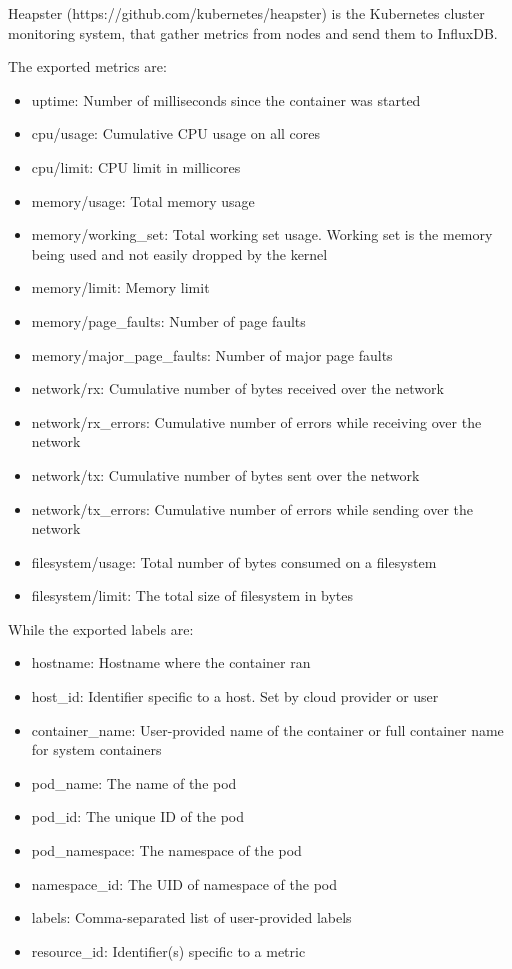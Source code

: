 Heapster (https://github.com/kubernetes/heapster) is the Kubernetes cluster monitoring system, that gather metrics from nodes and send them to InfluxDB.

The exported metrics are:
\begin{itemize}

\item
  uptime: Number of milliseconds since the container was started
\item
  cpu/usage: Cumulative CPU usage on all cores
\item
  cpu/limit: CPU limit in millicores
\item
  memory/usage: Total memory usage
\item
  memory/working\_set: Total working set usage. Working set is the
  memory being used and not easily dropped by the kernel
\item
  memory/limit: Memory limit
\item
  memory/page\_faults: Number of page faults
\item
  memory/major\_page\_faults: Number of major page faults
\item
  network/rx: Cumulative number of bytes received over the network
\item
  network/rx\_errors: Cumulative number of errors while receiving over
  the network
\item
  network/tx: Cumulative number of bytes sent over the network
\item
  network/tx\_errors: Cumulative number of errors while sending over the
  network
\item
  filesystem/usage: Total number of bytes consumed on a filesystem
\item
  filesystem/limit: The total size of filesystem in bytes
\end{itemize}

While the exported labels are:

\begin{itemize}
\item
  hostname: Hostname where the container ran
\item
  host\_id: Identifier specific to a host. Set by cloud provider or user
\item
  container\_name: User-provided name of the container or full container
  name for system containers
\item
  pod\_name: The name of the pod
\item
  pod\_id: The unique ID of the pod
\item
  pod\_namespace: The namespace of the pod
\item
  namespace\_id: The UID of namespace of the pod
\item
  labels: Comma-separated list of user-provided labels
\item
  resource\_id: Identifier(s) specific to a metric
\end{itemize}

